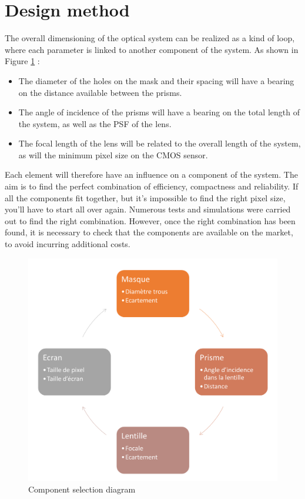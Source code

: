 \section{Design method}
The overall dimensioning of the optical system can be realized as a kind of loop, where each
parameter is linked to another component of the system. As shown in Figure \ref{fig:Opti_DiagrammChoices} :
\begin{itemize}
    \item The diameter of the holes on the mask and their spacing will have a bearing on the distance available between the prisms.
    \item The angle of incidence of the prisms will have a bearing on the total length of the system, as well as the \Gls{PSF} of the lens.
    \item The focal length of the lens will be related to the overall length of the system, as will the minimum pixel size on the CMOS sensor.
\end{itemize}
Each element will therefore have an influence on a component of the system. The aim is to find the perfect combination of efficiency,
compactness and reliability. If all the components fit together, but it's impossible to find the right pixel size,
you'll have to start all over again.
Numerous tests and simulations were carried out to find the right combination. However, once the right combination has been found,
it is necessary to check that the components are available on the market, to avoid incurring additional costs.
\begin{figure}[H]
    \centering
    \includegraphics[scale=0.25]{assets/figures/Optical Design/Diagramme_Limitation.png}
    \caption{Component selection diagram}
    \label{fig:Opti_DiagrammChoices}
\end{figure}